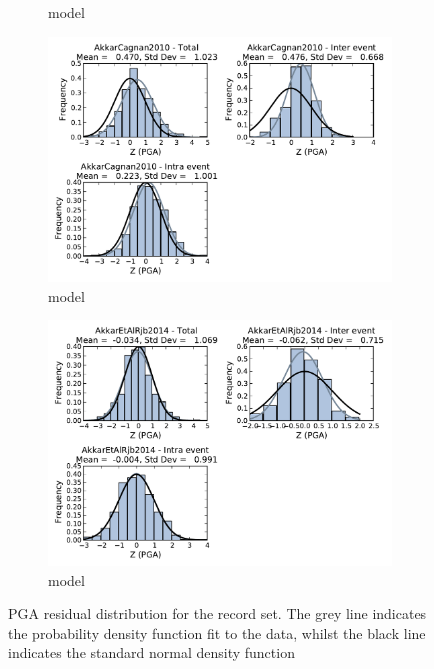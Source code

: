 \begin{figure}[htb]
\begin{subfigure}[b]{0.49\textwidth}
      \caption{\textcite{AkkarBommer2010} model}
      \label{fig:pga_res_ab2010}
  \end{subfigure}
    \begin{subfigure}[b]{0.49\textwidth}
      \includegraphics[width=\textwidth]{./figures/residuals/AC2010_Residuals_PGA.pdf}
      \caption{\textcite{AkkarCagnan2010} model}
      \label{fig:pga_res_ac2010}
  \end{subfigure}
      \begin{subfigure}[b]{0.49\textwidth}
      \includegraphics[width=\textwidth]{./figures/residuals/Akkar2014_Residuals_PGA.pdf}
     \caption{\textcite{Akkar_etal2014}model}
      \label{fig:pga_res_akkar2014}
  \end{subfigure}
  \caption{PGA residual distribution for the record set. The grey line indicates the probability density function fit to the data, whilst the black line indicates the standard normal density function}
  \label{fig:pga_resids}
\end{figure}

